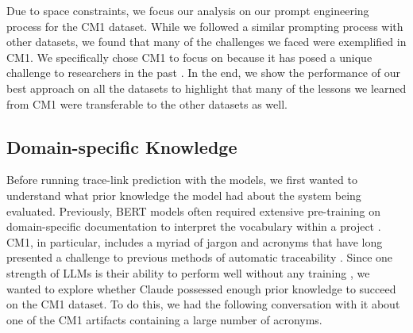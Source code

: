 Due to space constraints, we focus our analysis on our prompt engineering process for the CM1 dataset. While we followed a similar prompting process with other datasets, we found that many of the challenges we faced were exemplified in CM1. We specifically chose CM1 to focus on because it has posed a unique challenge to researchers in the past \cite{bert_pl, bert_nl}. In the end, we show the performance of our best approach on all the datasets to highlight that many of the lessons we learned from CM1 were transferable to the other datasets as well.

\subsection{Domain-specific Knowledge}
Before running trace-link prediction with the models, we first wanted to understand what prior knowledge the model had about the system being evaluated. Previously, BERT models often required extensive pre-training on domain-specific documentation to interpret the vocabulary within a project \cite{bert_pl, bert_nl}. CM1, in particular, includes a myriad of jargon and acronyms that have long presented a challenge to previous methods of automatic traceability \cite{cm1, rodriguez2023understanding}. Since one strength of LLMs is their ability to perform well without any training \cite{gpt3, gpt4}, we wanted to explore whether Claude possessed enough prior knowledge to succeed on the CM1 dataset. To do this, we had the following conversation with it about one of the CM1 artifacts containing a large number of acronyms.



